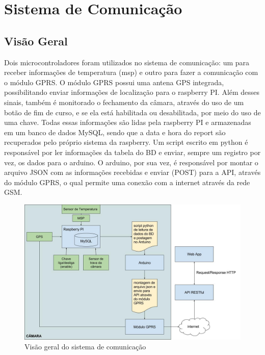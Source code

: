 \section{Sistema de Comunicação}

\subsection{Visão Geral}

 Dois microcontroladores foram utilizados no sistema de comunicação: um para receber informações de temperatura (msp) e outro para fazer a comunicação com o módulo GPRS. O módulo GPRS possui uma antena GPS integrada, possibilitando enviar informações de localização para o raspberry PI. Além desses sinais, também é monitorado o fechamento da câmara, através do uso de um botão de fim de curso, e se ela está habilitada ou desabilitada, por meio do uso de uma chave. Todas essas informações são lidas pela raspberry PI e armazenadas em um banco de dados MySQL, sendo que a data e hora do report são recuperados pelo próprio sistema da raspberry. Um script escrito em python é responsável por ler informações da tabela do BD e enviar, sempre um registro por vez, os dados para o arduino. O arduino, por sua vez, é responsável por montar o arquivo JSON com as informações recebidas e enviar (POST) para a API, através do módulo GPRS, o qual permite uma conexão com a internet através da rede GSM. 

\begin{figure}[H]
	\centering
	\includegraphics[width=16cm]{figuras/comunicacao_eletronica_software.jpg}
	\caption{Visão geral do sistema de comunicação}
\end{figure}

	
